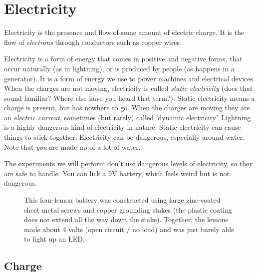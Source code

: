 \section{Electricity}

Electricity is the presence and flow of some amount of electric charge. It is the flow of \emph{electrons} through conductors such as copper wires.

Electricity is a form of energy that comes in positive and negative forms, that occur naturally (as in lightning), or is produced by people (as happens in a generator). It is a form of energy we use to power machines and electrical devices. When the charges are not moving, electricity is called \emph{static electricity} (does that sound familiar? Where else have you heard that term?). Static electricity means a charge is present, but has nowhere to go. 
When the charges are moving they are an \emph{electric current}, sometimes (but rarely) called 'dynamic electricity'. Lightning is a highly dangerous kind of electricity in nature. Static electricity can cause things to stick together. Electricity can be dangerous, especially around water. Note that \emph{you} are made up of a lot of water.

The experiments we will perform don't use dangerous levels of electricity, so they are safe to handle. You can lick a 9V battery, which feels weird but is not dangerous. 

\bigskip


\begin{figure}
\begin{center}
\medskip
\caption{This four-lemon battery was constructed using large zinc-coated sheet metal screws and copper grounding stakes (the plastic coating does not extend all the way down the stake). Together, the lemons made about 4 volts (open circuit / no load) and was just barely able to light up an LED.}
\end{center}
\end{figure}


\subsection*{Charge}

